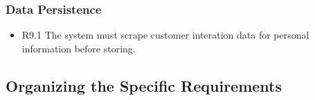 \documentclass[11pt]{article}
\begin{document}
\subsubsection{Data Persistence}
\begin{itemize}
  \item[] R9.1 The system must scrape customer interation data for personal information before storing.
\end{itemize}


\subsection{Organizing the Specific Requirements}

\end{document}

